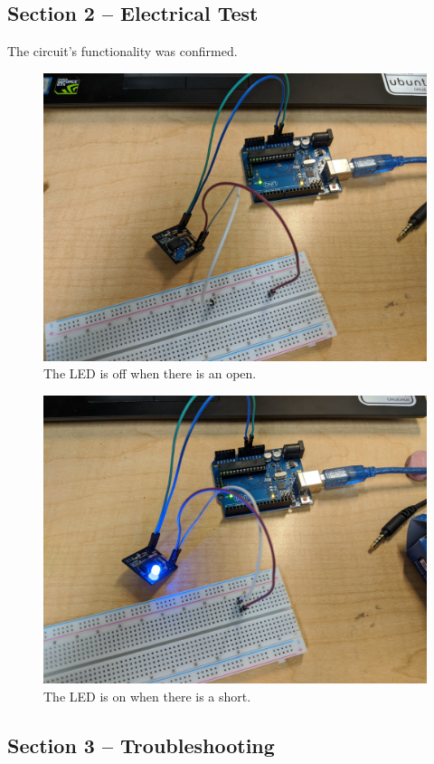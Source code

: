 \documentclass[12pt]{article}
\begin{document}
\subsection*{Section 2 -- Electrical Test}

The circuit's functionality was confirmed.

\begin{figure}[H]
  \centering
  \includegraphics[width=0.8\linewidth]{img/open.jpg}
  \caption{The LED is off when there is an open.}
  \label{}
\end{figure}

\begin{figure}[H]
  \centering
  \includegraphics[width=0.8\linewidth]{img/short.jpg}
  \caption{The LED is on when there is a short.}
  \label{}
\end{figure}

\subsection*{Section 3 -- Troubleshooting}
\end{document}
